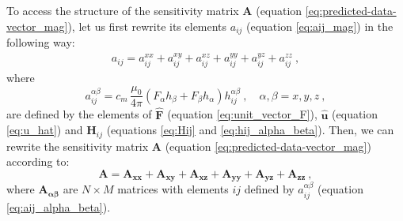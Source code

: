 To access the structure of the sensitivity matrix $\mathbf{A}$ 
(equation \ref{eq:predicted-data-vector_mag}), let us first rewrite its elements 
$a_{ij}$ (equation \ref{eq:aij_mag}) in the following way:
\begin{equation}
\begin{split}
a_{ij} = a^{xx}_{ij} + a^{xy}_{ij} + a^{xz}_{ij} + a^{yy}_{ij} + a^{yz}_{ij} + a^{zz}_{ij} \: ,
\end{split}
\label{eq:aij_mag_expand}
\end{equation}
where
\begin{equation}
a^{\alpha\beta}_{ij} = c_{m} \, \frac{\mu_{0}}{4\pi} 
\left( F_{\alpha} h_{\beta} + F_{\beta} h_{\alpha} \right) h^{\alpha\beta}_{ij}
\: , \quad \alpha, \beta = x, y, z \: ,
\label{eq:aij_alpha_beta}
\end{equation}
are defined by the elements of $\hat{\mathbf{F}}$ 
(equation \ref{eq:unit_vector_F}), $\hat{\mathbf{u}}$ (equation \ref{eq:u_hat}) and 
$\mathbf{H}_{ij}$ (equations \ref{eq:Hij} and \ref{eq:hij_alpha_beta}).
Then, we can rewrite the sensitivity matrix $\mathbf{A}$ 
(equation \ref{eq:predicted-data-vector_mag}) according to:
\begin{equation}
\mathbf{A} = \mathbf{A_{xx}} + \mathbf{A_{xy}} + \mathbf{A_{xz}} + 
\mathbf{A_{yy}} + \mathbf{A_{yz}} + \mathbf{A_{zz}} \: ,
\label{eq:A_expand}
\end{equation}
where $\mathbf{A_{\boldsymbol{\alpha\beta}}}$ are $N \times M$ matrices with elements 
$ij$ defined by $a^{\alpha\beta}_{ij}$ (equation \ref{eq:aij_alpha_beta}).

